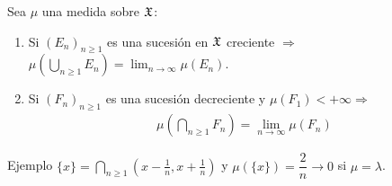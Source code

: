 \begin{lemma}
    Sea $\mu$ una medida sobre $\mathfrak{X}$:
    \begin{enumerate}
        \item Si $(E_n)_{n \geq 1}$ es una sucesión en $\mathfrak{X}$ creciente $\Rightarrow$ $\mu(\bigcup_{n \geq 1} E_n) = \lim_{n \to \infty} \mu(E_n)$.
        \item Si $(F_n)_{n \geq 1}$ es una sucesión decreciente y $\mu(F_1) < +\infty \Rightarrow$ \begin{align*}
                  \mu(\bigcap_{n \geq 1} F_n) = \lim_{n \to \infty} \mu(F_n)
              \end{align*}
    \end{enumerate}
    Ejemplo $\{ x \} = \bigcap_{n \geq 1} (x - \frac{1}{n}, x + \frac{1}{n})$ y $\mu(\{ x \}) = \dfrac{2}{n} \to 0$ si $\mu = \lambda$.


\end{lemma}
